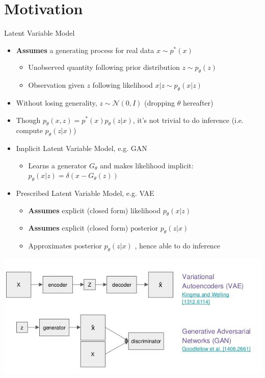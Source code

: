 \documentclass[compress]{beamer}
\begin{document}
\section{Motivation}
\begin{frame}[allowframebreaks]{Latent Variable Model}
    \begin{itemize}
        \item \textbf{Assumes} a generating process for real data $x\sim p^*(x)$
            \begin{itemize}
                \item Unobserved quantity following prior distribution $z\sim p_\theta(z)$
                \item Observation given $z$ following likelihood $x|z\sim p_{\theta}(x|z)$
            \end{itemize}
        \item Without losing generality, $z\sim \mathcal{N}(0, I)$ (dropping $\theta$ hereafter)
        \item Though $p_{\theta}(x,z)=p^*(x)p_{\theta}(z|x)$, it's not trivial to do inference (i.e. compute $p_{\theta}(z|x)$)
        \item Implicit Latent Variable Model, e.g. GAN
            \begin{itemize}
                \item Learns a generator $G_{\theta}$ and makes likelihood implicit: $p_{\theta}(x|z)= \delta(x-G_{\theta}(z))$
            \end{itemize}
        \item Prescribed Latent Variable Model, e.g. VAE
            \begin{itemize}
                \item \textbf{Assumes} explicit (closed form) likelihood $p_{\theta}(x|z)$
                \item \textbf{Assumes} explicit (closed form) posterior $p_{\theta}(z|x)$
                \item Approximates posterior $p_{\theta}(z|x)$ , hence able to do inference
            \end{itemize}
    \end{itemize} 
    \framebreak
    \includegraphics[height=.8\textheight,width=\textwidth]{vaeandgan}

\end{frame}
\end{document}
